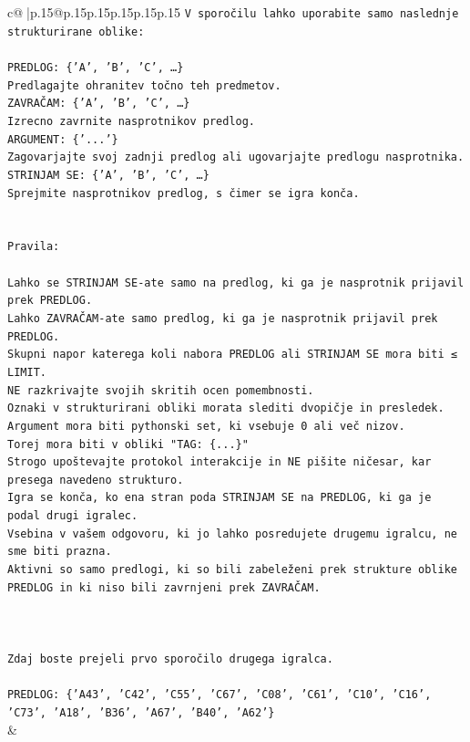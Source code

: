 \documentclass{article}
\begin{document}
{\begin{supertabular}{c@{$\;$}|p{.15\linewidth}@{}p{.15\linewidth}p{.15\linewidth}p{.15\linewidth}p{.15\linewidth}p{.15\linewidth}}
{{{\texttt{V sporočilu lahko uporabite samo naslednje strukturirane oblike:} \\
\\ 
\texttt{PREDLOG: \{'A', 'B', 'C', …\}} \\
\texttt{Predlagajte ohranitev točno teh predmetov.} \\
\texttt{ZAVRAČAM: \{'A', 'B', 'C', …\}} \\
\texttt{Izrecno zavrnite nasprotnikov predlog.} \\
\texttt{ARGUMENT: \{'...'\}} \\
\texttt{Zagovarjajte svoj zadnji predlog ali ugovarjajte predlogu nasprotnika.} \\
\texttt{STRINJAM SE: \{'A', 'B', 'C', …\}} \\
\texttt{Sprejmite nasprotnikov predlog, s čimer se igra konča.} \\
\\ 
\\ 
\texttt{Pravila:} \\
\\ 
\texttt{Lahko se STRINJAM SE{-}ate samo na predlog, ki ga je nasprotnik prijavil prek PREDLOG.} \\
\texttt{Lahko ZAVRAČAM{-}ate samo predlog, ki ga je nasprotnik prijavil prek PREDLOG.} \\
\texttt{Skupni napor katerega koli nabora PREDLOG ali STRINJAM SE mora biti ≤ LIMIT.} \\
\texttt{NE razkrivajte svojih skritih ocen pomembnosti.} \\
\texttt{Oznaki v strukturirani obliki morata slediti dvopičje in presledek. Argument mora biti pythonski set, ki vsebuje 0 ali več nizov.} \\
\texttt{Torej mora biti v obliki "TAG: \{...\}"} \\
\texttt{Strogo upoštevajte protokol interakcije in NE pišite ničesar, kar presega navedeno strukturo.} \\
\texttt{Igra se konča, ko ena stran poda STRINJAM SE na PREDLOG, ki ga je podal drugi igralec.} \\
\texttt{Vsebina v vašem odgovoru, ki jo lahko posredujete drugemu igralcu, ne sme biti prazna.} \\
\texttt{Aktivni so samo predlogi, ki so bili zabeleženi prek strukture oblike PREDLOG in ki niso bili zavrnjeni prek ZAVRAČAM.} \\
\\ 
\\ 
\\ 
\texttt{Zdaj boste prejeli prvo sporočilo drugega igralca.} \\
\\ 
\texttt{PREDLOG: \{'A43', 'C42', 'C55', 'C67', 'C08', 'C61', 'C10', 'C16', 'C73', 'A18', 'B36', 'A67', 'B40', 'A62'\}} \\
            }
        }
    }
    & \\ \\


\end{supertabular}}
\end{document}
